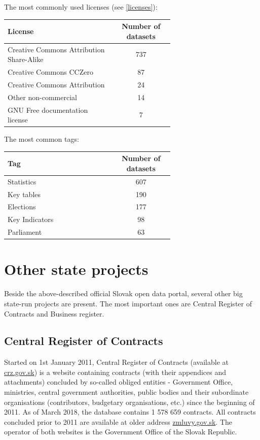 \documentclass[thesis=B,english]{FITthesis}[2012/06/26]
\begin{document}
    \vspace{20px}
    The most commonly used licenses (see \ref{licenses}):
    \begin{center}
        \begin{tabular}{  p{0.65\linewidth} | c }
        \textbf{License} & \textbf{Number of datasets} \\ \hline
        Creative Commons Attribution Share-Alike & 737 \\
        Creative Commons CCZero & 87 \\
        Creative Commons Attribution & 24 \\
        Other non-commercial & 14 \\
        GNU Free documentation license & 7 \\
        \end{tabular}
    \end{center}
    \vspace{20px}
    The most common tags:
    \begin{center}
        \begin{tabular}{  p{0.65\linewidth} | c }
        \textbf{Tag} & \textbf{Number of datasets} \\ \hline
        Statistics & 607 \\
        Key tables & 190 \\
        Elections & 177 \\
        Key Indicators & 98 \\
        Parliament & 63 \\
        \end{tabular}
    \end{center}
    \section{Other state projects}
    Beside the above-described official Slovak open data portal, several other big state-run projects are present. The most important ones are Central Register of Contracts and Business register.
    \subsection{Central Register of Contracts}
    \label{crz}
    	Started on 1st January 2011, Central Register of Contracts (available at \href{https://www.crz.gov.sk}{crz.gov.sk}) is a website containing contracts (with their appendices and  attachments) concluded by so-called obliged entities - Government Office, ministries, central government authorities, public bodies and their subordinate organisations (contributors, budgetary organisations, etc.) since the beginning of 2011. As of March 2018, the database contains 1 578 659 contracts. All contracts concluded prior to 2011 are available at older address \href{http://www.zmluvy.gov.sk}{zmluvy.gov.sk}. The operator of both websites is the Government Office of the Slovak Republic. 
    	
\end{document}
